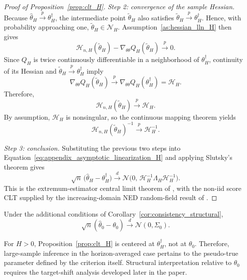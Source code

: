\begin{proof}[Proof of Proposition~\ref{prop:clt_H}]
	\emph{Step 2: convergence of the sample Hessian.}
	Because $\hat\theta_H \xrightarrow{p} \theta_H^\dagger$,
	the intermediate point $\tilde\theta_H$ also satisfies
	$\tilde\theta_H \xrightarrow{p} \theta_H^\dagger$.
	Hence, with probability approaching one, $\tilde\theta_H \in \mathcal N_H$.
	Assumption~\ref{as:hessian_lln_H} then gives
	\[
	\mathcal H_{n,H}(\tilde\theta_H)
	-
	\nabla_{\theta\theta} Q_H(\tilde\theta_H)
	\xrightarrow{p}
	0.
	\]
	Since $Q_H$ is twice continuously differentiable in a neighborhood of $\theta_H^\dagger$,
	continuity of its Hessian and $\tilde\theta_H \xrightarrow{p} \theta_H^\dagger$ imply
	\[
	\nabla_{\theta\theta} Q_H(\tilde\theta_H)
	\xrightarrow{p}
	\nabla_{\theta\theta} Q_H(\theta_H^\dagger)
	=
	\mathcal H_H.
	\]
	Therefore,
	\[
	\mathcal H_{n,H}(\tilde\theta_H)
	\xrightarrow{p}
	\mathcal H_H.
	\]
	By assumption, $\mathcal H_H$ is nonsingular, so the continuous mapping theorem yields
	\[
	\mathcal H_{n,H}(\tilde\theta_H)^{-1}
	\xrightarrow{p}
	\mathcal H_H^{-1}.
	\]
	
	\emph{Step 3: conclusion.}
	Substituting the previous two steps into
	Equation~\eqref{eq:appendix_asymptotic_linearization_H} and applying Slutsky's theorem gives
	\[
	\sqrt{n}\,\bigl(\hat\theta_H-\theta_H^\dagger\bigr)
	\overset{d}{\longrightarrow}
	\mathcal N\bigl(0,\,\mathcal H_H^{-1}\Lambda_H\mathcal H_H^{-1}\bigr).
	\]
	This is the extremum-estimator central limit theorem of \citet[Theorem~3.1]{NM94}, with the non-iid score CLT supplied by the increasing-domain NED random-field result of \citet[Theorem~4]{JP12}.
\end{proof}

\begin{corollary}
	\label{cor:clt_structural}
	Under the additional conditions of Corollary~\ref{cor:consistency_structural},
	\[
	\sqrt{n}
	\left(
	\hat{\theta}_0 - \theta_0
	\right)
	\overset{d}{\longrightarrow}
	\mathcal N(0,\Sigma_0).
	\]
\end{corollary}

\begin{remark}
	\label{rem:interpretation_center}
	For \(H>0\), Proposition~\ref{prop:clt_H} is centered at \(\theta_H^\dagger\), not at \(\theta_0\). Therefore, large-sample inference in the horizon-averaged case pertains to the pseudo-true parameter defined by the criterion itself. Structural interpretation relative to \(\theta_0\) requires the target-shift analysis developed later in the paper.
\end{remark}

